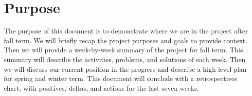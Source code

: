 \section{Purpose}
The purpose of this document is to demonstrate where we are in the project after fall term. We will briefly recap the project purposes and goals to provide context. Then we will provide a week-by-week summary of the project for fall term. This summary will describe the activities, problems, and solutions of each week. Then we will discuss our current position in the progress and describe a high-level plan for spring and winter term. This document will conclude with a retrospectives chart, with positives, deltas, and actions for the last seven weeks.